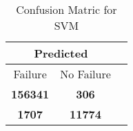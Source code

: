 \begin{table}[] 
\caption{Confusion Matric for SVM} 
\label{Table: Prediction Accuracy-NoneSVM100.0EKF-ignoreReflection-Reflection} 
\centering 
\begin{tabular} 
 {@{}ccc@{}} 
\toprule 
\multicolumn{2}{c}{\textbf{Predicted}}
 \\ \midrule 
\multicolumn{1}{|c|}{Failure} & 
\multicolumn{1}{c|}{No Failure}
 \\ \midrule 
\multicolumn{1}{|c|}{\color{green}\textbf{156341}} & 
\multicolumn{1}{c|}{\color{red}\textbf{306}}
 \\ \midrule 
\multicolumn{1}{|c|}{\color{red}\textbf{1707}} & 
\multicolumn{1}{c|}{\color{green}\textbf{11774}}
 \\ \bottomrule 
\end{tabular} 
\end{table} 
